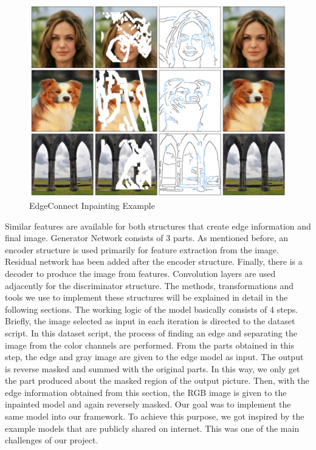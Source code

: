 \begin{figure}[h!]
    \centering
    \includegraphics[scale=0.85]{figures/chapter4/ExampleEdgeConnect.PNG}
    \vspace*{5mm}
    \caption{EdgeConnect Inpainting Example \cite{edgeconnect}}
    \label{fig:edgeconnect-example}
\end{figure}

Similar features are available for both structures that create edge information and final image. Generator Network consists of 3 parts. As mentioned before, an encoder structure is used primarily for feature extraction from the image. Residual network has been added after the encoder structure. Finally, there is a decoder to produce the image from features. Convolution layers are used adjacently for the discriminator structure.
The methods, transformations and tools we use to implement these structures will be explained in detail in the following sections.\newline
The working logic of the model basically consists of 4 steps. Briefly, the image selected as input in each iteration is directed to the dataset script. In this dataset script, the process of finding an edge and separating the image from the color channels are performed. From the parts obtained in this step, the edge and gray image are given to the edge model as input. The output is reverse masked and summed with the original parts. In this way, we only get the part produced about the masked region of the output picture. Then, with the edge information obtained from this section, the RGB image is given to the inpainted model and again reversely masked. \newline
Our goal was to implement the same model into our framework. To achieve this purpose, we got inspired by the example models that are publicly shared on internet. This was one of the main challenges of our project.  



